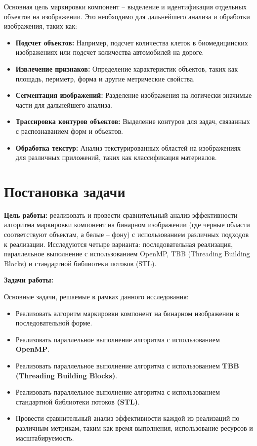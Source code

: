 \documentclass[a4paper, 14pt]{article}
\begin{document}
        Основная цель маркировки компонент – выделение и идентификация отдельных объектов на изображении. Это необходимо для дальнейшего анализа и обработки изображения, таких как:
        
        \begin{itemize}
            \item \textbf{Подсчет объектов:} Например, подсчет количества клеток в биомедицинских изображениях или подсчет количества автомобилей на дороге.
            \item \textbf{Извлечение признаков:} Определение характеристик объектов, таких как площадь, периметр, форма и другие метрические свойства.
            \item \textbf{Сегментация изображений:} Разделение изображения на логически значимые части для дальнейшего анализа.
            \item \textbf{Трассировка контуров объектов:} Выделение контуров для задач, связанных с распознаванием форм и объектов.
            \item \textbf{Обработка текстур:} Анализ текстурированных областей на изображениях для различных приложений, таких как классификация материалов.
        \end{itemize}

	\newpage
	\section*{\centering Постановка задачи}
	\textbf{Цель работы:} реализовать и провести сравнительный анализ эффективности алгоритма маркировки компонент на бинарном изображении (где черные области соответствуют объектам, а белые – фону) с использованием различных подходов к реализации. Исследуются четыре варианта: последовательная реализация, параллельное выполнение с использованием OpenMP, TBB (Threading Building Blocks) и стандартной библиотеки потоков (STL).

	\textbf{Задачи работы:}

        Основные задачи, решаемые в рамках данного исследования:
	\vspace{-1em}
	\begin{itemize}[leftmargin=3em]
		\setlength\itemsep{0cm}
            \item Реализовать алгоритм маркировки компонент на бинарном изображении в последовательной форме.
            \item Реализовать параллельное выполнение алгоритма с использованием \textbf{OpenMP}.
            \item Реализовать параллельное выполнение алгоритма с использованием \textbf{TBB (Threading Building Blocks)}.
            \item Реализовать параллельное выполнение алгоритма с использованием стандартной библиотеки потоков \textbf{(STL)}.
            \item Провести сравнительный анализ эффективности каждой из реализаций по различным метрикам, таким как время выполнения, использование ресурсов и масштабируемость.
	\end{itemize}
\end{document}
